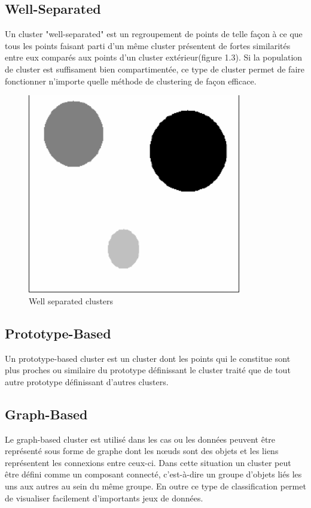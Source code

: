 \documentclass[memoire.tex]{subfiles}
\begin{document}
\subsection{Well-Separated}
Un cluster "well-separated" est un regroupement de points de telle façon à ce que tous les points faisant parti d'un même cluster présentent de fortes similarités entre eux comparés aux points d'un cluster extérieur(figure 1.3). Si la population de cluster est suffisament bien compartimentée, ce type de cluster permet de faire fonctionner n'importe quelle méthode de clustering de façon efficace.
	\begin{figure}[h!]
		\centerline{\includegraphics[scale=0.8]{img/well_separated.png}}
		\caption{Well separated clusters}
	\end{figure}

\subsection{Prototype-Based}
Un prototype-based cluster est un cluster dont les points qui le constitue sont plus proches ou similaire du prototype définissant le cluster traité que de tout autre prototype définissant d'autres clusters.

\subsection{Graph-Based}
Le graph-based cluster est utilisé dans les cas ou les données peuvent être représenté sous forme de graphe dont les nœuds sont des objets et les liens représentent les connexions entre ceux-ci. Dans cette situation un cluster peut être défini comme un composant connecté,  c'est-à-dire un groupe d'objets liés les uns aux autres au sein du même groupe. En outre ce type de classification permet de visualiser facilement d'importants jeux de données.
\end{document}
